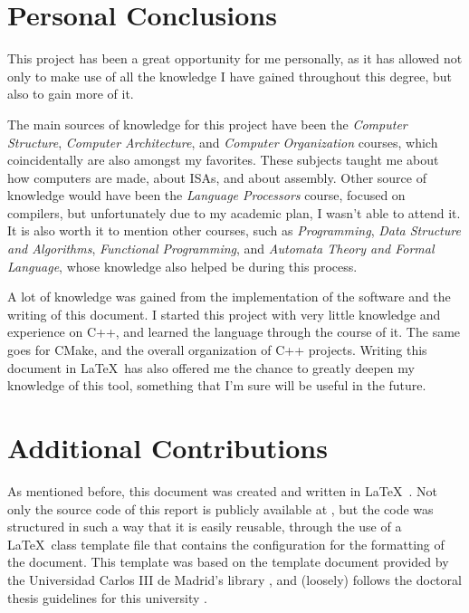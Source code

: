 \section{Personal Conclusions}\label{sec:personal-conclusions}
This project has been a great opportunity for me personally, as it has allowed not only to make use of all the knowledge I have gained throughout this degree, but also to gain more of it.

The main sources of knowledge for this project have been the \textit{Computer Structure}, \textit{Computer Architecture}, and \textit{Computer Organization} courses, which coincidentally are also amongst my favorites. These subjects taught me about how computers are made, about \glspl{ISA}, and about \gls{assembly}. Other source of knowledge would have been the \textit{Language Processors} course, focused on compilers, but unfortunately due to my academic plan, I wasn't able to attend it.
It is also worth it to mention other courses, such as \textit{Programming}, \textit{Data Structure and Algorithms}, \textit{Functional Programming}, and \textit{Automata Theory and Formal Language}, whose knowledge also helped be during this process.

A lot of knowledge was gained from the implementation of the software and the writing of this document. I started this project with very little knowledge and experience on C++, and learned the language through the course of it. The same goes for CMake, and the overall organization of C++ projects. Writing this document in \LaTeX~has also offered me the chance to greatly deepen my knowledge of this tool, something that I'm sure will be useful in the future.



\section{Additional Contributions}\label{sec:contributions}
As mentioned before, this document was created and written in \LaTeX~\parencite{lamport1986latex}. Not only the source code of this report is publicly available at \myrepo, but the code was structured in such a way that it is easily reusable, through the use of a \LaTeX~class template file that contains the configuration for the formatting of the document. This template was based on the template document provided by the Universidad Carlos III de Madrid's library \parencite{UC3MthesisTemplate}, and (loosely) follows the doctoral thesis guidelines for this university \parencite{UC3MthesisStyleGuide}.

